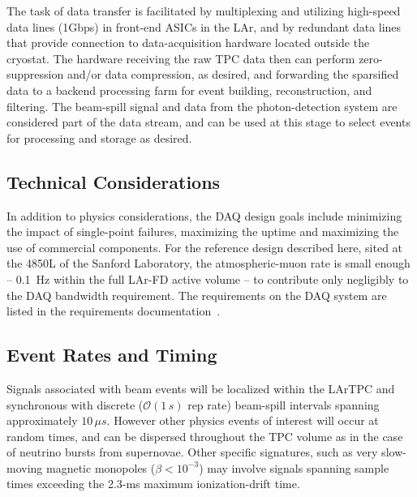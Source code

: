 The task of data transfer is facilitated by multiplexing and utilizing
high-speed data lines (1Gbps) in front-end ASICs in the LAr, and by
redundant data lines that provide connection to data-acquisition
hardware located outside the cryostat.  The hardware receiving the raw
TPC data then can perform zero-suppression and/or data compression, as
desired, and forwarding the sparsified data to a backend processing
farm for event building, reconstruction, and filtering.  
The \LBNE beam-spill signal and data from the photon-detection system
are considered part of the data stream, and can be used at this stage
to select events for processing and storage as desired.

\subsection{Technical Considerations}
In addition to physics considerations, the DAQ design goals include  
minimizing the impact of single-point failures, maximizing the uptime and maximizing 
the use of commercial components.  
For the reference design described here, sited at the 4850L of the Sanford Laboratory, the 
atmospheric-muon rate is small enough -- 0.1~Hz within the full LAr-FD active 
volume -- to contribute only negligibly to the DAQ bandwidth requirement.
The requirements on the DAQ system are listed in the
requirements documentation~\cite{lar-fd-req}.

\subsection{Event Rates and Timing}
\label{sec:v5-daq-assumptions}


Signals associated with beam events will be localized within the 
LArTPC and synchronous with discrete (${\mathcal O}(1\,s)$ rep rate) 
beam-spill intervals spanning 
approximately $10\,\mu s$.  
However other physics events of interest will occur at random 
times, and can be dispersed throughout the TPC volume as in the case 
of neutrino bursts from supernovae.  Other specific signatures, such 
as very slow-moving magnetic monopoles ($\beta < 10^{-3}$) may involve 
signals spanning sample times exceeding the 2.3-ms maximum ionization-drift time.  

